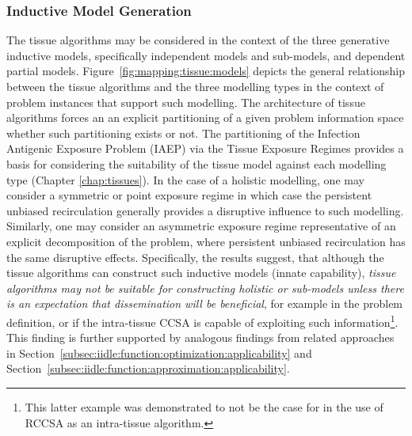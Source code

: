 \subsubsection{Inductive Model Generation}
The tissue algorithms may be considered in the context of the three generative inductive models, specifically independent models and sub-models, and dependent partial models.
Figure~\ref{fig:mapping:tissue:models} depicts the general relationship between the tissue algorithms and the three modelling types in the context of problem instances that support such modelling. The architecture of tissue algorithms forces an an explicit partitioning of a given problem information space whether such partitioning exists or not. 
The partitioning of the Infection Antigenic Exposure Problem (IAEP) via the Tissue Exposure Regimes provides a basis for considering the suitability of the tissue model against each modelling type (Chapter \ref{chap:tissues}). In the case of a holistic modelling, one may consider a symmetric or point exposure regime in which case the persistent unbiased recirculation generally provides a disruptive influence to such modelling. Similarly, one may consider an asymmetric exposure regime representative of an explicit decomposition of the problem, where persistent unbiased recirculation has the same disruptive effects. 
Specifically, the results suggest, that although the tissue algorithms can construct such inductive models (innate capability), \emph{tissue algorithms may not be suitable for constructing holistic or sub-models unless there is an expectation that dissemination will be beneficial}, for example in the problem definition, or if the intra-tissue CCSA is capable of exploiting such information\footnote{This latter example was demonstrated to not be the case for in the use of RCCSA as an intra-tissue algorithm.}. This finding is further supported by analogous findings from related approaches in Section~\ref{subsec:iidle:function:optimization:applicability} and Section~\ref{subsec:iidle:function:approximation:applicability}.
%
%

